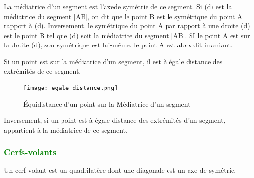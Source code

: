 \documentclass{article}
\begin{document}
\begin{tcolorbox}[colback=red!10!white, colframe=red!75!black, title=\textcolor{white}{Propriété }, sharp corners=south]
    La médiatrice d'un segment est l'axede symétrie de ce segment. Si (d) est la médiatrice du segment [AB], on dit que le point B est le symétrique du point A rapport à (d).
    Inversement, le symétrique du point A par rapport à une droite (d) est le point B tel que (d) soit la médiatrice du segment [AB]. SI le point A est sur la droite (d), son symétrique est lui-même: le point A est alors dit invariant. 
\end{tcolorbox}

\begin{tcolorbox}[colback=red!10!white, colframe=red!75!black, title=\textcolor{white}{Propriété}, sharp corners=south]
   Si un point est sur la médiatrice d'un segment, il est à égale distance des extrémités de ce segment.
\end{tcolorbox}

\begin{figure}[H]
    \centering
    \texttt{[image: egale\_distance.png]}
    \caption{Équidistance d'un point sur la Médiatrice d'un segment}
    \label{fig:enter-label}
\end{figure}

\begin{tcolorbox}[colback=red!10!white, colframe=red!75!black, title=\textcolor{white}{Propriété}, sharp corners=south]

Inversement, si un point est à égale distance des extrémités d'un segment, appartient à la médiatrice de ce segment.
\end{tcolorbox}

\vspace{0.35cm}

\subsubsection{\textcolor{green}{Cerfs-volants}}

\vspace{0.2cm}

\begin{tcolorbox}[colback=red!10!white, colframe=red!75!black, title=\textcolor{white}{Définition : Cerf-volant}, sharp corners=south]
    Un cerf-volant est un quadrilatère dont une diagonale est un axe de symétrie.
\end{tcolorbox}

\vspace{0.2cm}
\end{document}
